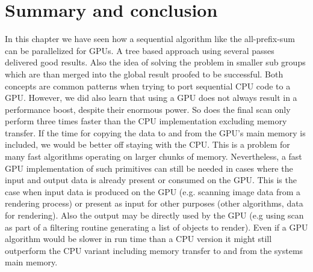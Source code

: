 \section{Summary and conclusion}
In this chapter we have seen how a sequential algorithm like the all-prefix-sum can be parallelized for GPUs. A tree based approach using several passes delivered good results. Also the idea of solving the problem in smaller sub groups which are than merged into the global result proofed to be successful. Both concepts are common patterns when trying to port sequential CPU code to a GPU. However, we did also learn that using a GPU does not always result in a performance boost, despite their enormous power. So does the final scan only perform three times faster than the CPU implementation excluding memory transfer. If the time for copying the data to and from the GPU's main memory is included, we would be better off staying with the CPU. This is a problem for many fast algorithms operating on larger chunks of memory. Nevertheless, a fast GPU implementation of such primitives can still be needed in cases where the input and output data is already present or consumed on the GPU. This is the case when input data is produced on the GPU (e.g. scanning image data from a rendering process) or present as input for other purposes (other algorithms, data for rendering). Also the output may be directly used by the GPU (e.g using scan as part of a filtering routine generating a list of objects to render). Even if a GPU algorithm would be slower in run time than a CPU version it might still outperform the CPU variant including memory transfer to and from the systems main memory.
